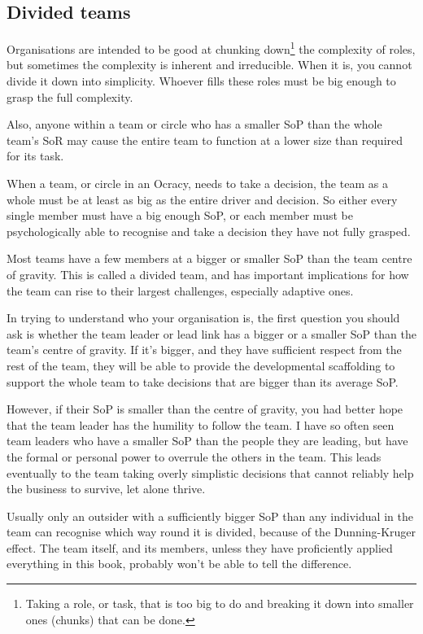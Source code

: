 \subsection{Divided teams}
\label{section:divided-teams}
Organisations are intended to be good at chunking down\footnote{Taking a role, or task, that is too big to do and breaking it down into smaller ones (chunks) that can be done.} the complexity of roles, but sometimes the complexity is inherent and irreducible. When it is, you cannot divide it down into simplicity. Whoever fills these roles must be big enough to grasp the full complexity. 


Also, anyone within a team or circle who has a smaller SoP than the whole team’s SoR  may cause the entire team to function at a lower size than required for its task.


When a team, or circle in an Ocracy, needs to take a decision, the team as a whole must be at least as big as the entire driver and decision. So either every single member must have a big enough SoP, or each member must be psychologically able to recognise and take a decision they have not fully grasped. 


Most teams have a few members at a bigger or smaller SoP than the team centre of gravity. This is called a divided team, and has important implications for how the team can rise to their largest challenges, especially adaptive ones. 


In trying to understand who your organisation  is, the first question you should ask is whether the team leader or lead link has a bigger or a smaller SoP than the team's centre of gravity. If it’s bigger, and they have sufficient respect from the rest of the team, they will be able to provide the developmental scaffolding to support the whole team to take decisions that are bigger than its average SoP.


However, if their SoP is smaller than the centre of gravity, you had better hope that the team leader has the humility to follow the team. I have so often seen team leaders who have a smaller SoP than the people they are leading, but have the formal or personal power to overrule the others in the team. This leads eventually to the team taking overly simplistic decisions that cannot reliably help the business to survive, let alone thrive.


Usually only an outsider with a sufficiently bigger SoP than any individual in the team can recognise which way round it is divided, because of the Dunning-Kruger effect.  The team itself, and its members, unless they have proficiently applied everything in this book, probably won’t be able to tell the difference.


